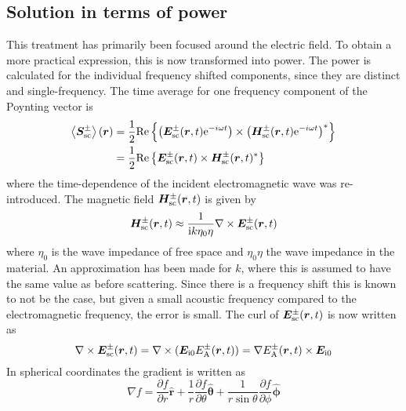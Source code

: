 \documentclass[11pt,twoside]{eitExjobb}
\begin{document}
	\subsection{Solution in terms of power \label{sec:app-derivations-radar-power}}
	This treatment has primarily been focused around the electric field. To obtain a more practical expression, this is now transformed into power. The power is calculated for the individual frequency shifted components, since they are distinct and single-frequency. The time average for one frequency component of the Poynting vector is \cite{Kristensson2008}
	\begin{equation*}
	\begin{split}
		\left< \bm{S}_{\mathrm{sc}}^\pm \right> (\bm{r}) &= \frac{1}{2} \mathrm{Re}\left\{ \left( \bm{E}_{\mathrm{sc}}^\pm (\bm{r}, t) \mathrm{e}^{-i\omega t} \right) \times \left( \bm{H}_{\mathrm{sc}}^{\pm} (\bm{r}, t) \mathrm{e}^{-i\omega t} \right)^* \right\} \\
		&= \frac{1}{2} \mathrm{Re}\left\{ \bm{E}_{\mathrm{sc}}^\pm (\bm{r}, t) \times \bm{H}_{\mathrm{sc}}^{\pm} (\bm{r}, t)^* \right\}
	\end{split}
	\end{equation*}
	where the time-dependence of the incident electromagnetic wave was re-introduced. The magnetic field $\bm{H}_{\mathrm{sc}}^\pm (\bm{r}, t)$ is given by \cite{Kristensson2008}
	\begin{equation*}
		\bm{H}_{\mathrm{sc}}^\pm (\bm{r}, t) \approx \frac{1}{\mathrm{i} k \eta_0 \eta} \nabla \times \bm{E}_{\mathrm{sc}}^\pm (\bm{r}, t)
	\end{equation*}
	where $\eta_0$ is the wave impedance of free space and $\eta_0 \eta$ the wave impedance in the material. An approximation has been made for $k$, where this is assumed to have the same value as before scattering. Since there is a frequency shift this is known to not be the case, but given a small acoustic frequency compared to the electromagnetic frequency, the error is small. The curl of $\bm{E}_{\mathrm{sc}}^\pm (\bm{r}, t)$ is now written as
	\begin{equation*}
		\nabla \times \bm{E}_{\mathrm{sc}}^\pm (\bm{r}, t) = \nabla \times (\bm{E}_{\mathrm{i}0} E_{\mathrm{A}}^\pm (\bm{r},t)) = \nabla E_{\mathrm{A}}^\pm (\bm{r},t) \times \bm{E}_{\mathrm{i}0}
	\end{equation*}
	In spherical coordinates the gradient is written as \cite{Griffiths2014}
	\begin{equation*}
		\nabla f = \frac{\partial f}{\partial r} \bm{\hat{r}} + \frac{1}{r} \frac{\partial f}{\partial \theta} \bm{\hat{\theta}} + \frac{1}{r\sin{\theta}} \frac{\partial f}{\partial \phi} \bm{\hat{\phi}}
	\end{equation*}
\end{document}
